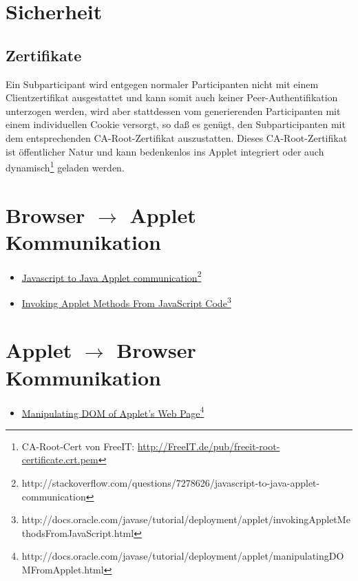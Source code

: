 \documentclass[dvips,12pt,a4paper]{article}
\newcommand{\myul}[1]{\ul{#1}}
\newcommand{\jsToAppletComUrlA}{\mbox{http://stackoverflow.com/questions/7278626/javascript-to-java-applet-communication}}
\newcommand{\jsToAppletComUrlB}{\mbox{http://docs.oracle.com/javase/tutorial/deployment/applet/invokingAppletMethodsFromJavaScript.html}}
\newcommand{\appletToDom}{\mbox{http://docs.oracle.com/javase/tutorial/deployment/applet/manipulatingDOMFromApplet.html}}
\begin{document}
\section{Sicherheit}
\subsection{Zertifikate}
Ein Subparticipant wird entgegen normaler Participanten nicht mit einem
Clientzertifikat ausgestattet und kann somit auch keiner Peer-Authentifikation
unterzogen werden, wird aber stattdessen vom generierenden Participanten mit
einem individuellen Cookie versorgt, so daß es genügt, den Subparticipanten mit
dem entsprechenden CA-Root-Zertifikat auszustatten. Dieses CA-Root-Zertifikat
ist öffentlicher Natur und kann bedenkenlos ins Applet integriert oder auch
dynamisch\footnote{CA-Root-Cert von FreeIT:
\url{http://FreeIT.de/pub/freeit-root-certificate.crt.pem}} geladen werden.



\clearpage
\begin{appendix}
\section{Browser $\rightarrow$ Applet Kommunikation}\label{btoacom}
\begin{itemize}
  \item \href{\jsToAppletComUrlA}{\myul{Javascript to Java Applet communication}}\footnote{\jsToAppletComUrlA}
  \item \href{\jsToAppletComUrlB}{\myul{Invoking Applet Methods From JavaScript Code}}\footnote{\jsToAppletComUrlB}
\end{itemize}
\section{Applet $\rightarrow$ Browser Kommunikation}
\begin{itemize}
  \item \href{\appletToDom}{\myul{Manipulating DOM of Applet's Web Page}}\footnote{\appletToDom}
\end{itemize}
\end{appendix}
\end{document}
